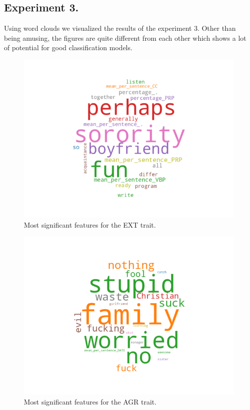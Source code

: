 \documentclass[10pt, a4paper]{article}
\begin{document}
\subsection{Experiment 3.}

Using word clouds we visualized the results of the experiment 3.
Other than being amusing, the figures are quite different from each other which shows a lot of potential for good classification models.

\begin{figure}
\begin{center}
  \includegraphics[width=\columnwidth]{figures/cEXT.png}
  \caption{Most significant features for the EXT trait.}
  \label{fig:figure1}
\end{center}
\end{figure}

\begin{figure}
\begin{center}
  \includegraphics[width=\columnwidth]{figures/cAGR.png}
  \caption{Most significant features for the AGR trait.}
  \label{fig:figure2}
\end{center}
\end{figure}
\end{document}
